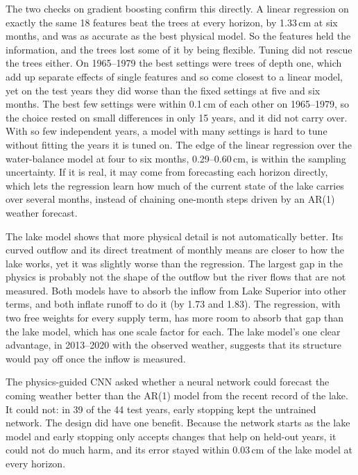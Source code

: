 \documentclass{article}
\begin{document}
The two checks on gradient boosting confirm this directly. A linear regression on exactly the same
18 features beat the trees at every horizon, by 1.33\,cm at six months, and was as accurate as the
best physical model. So the features held the information, and the trees lost some of it by being
flexible. Tuning did not rescue the trees either. On 1965--1979 the best settings were trees of
depth one, which add up separate effects of single features and so come closest to a linear
model, yet on the test years they did worse than the fixed settings at five and six months. The
best few settings were within 0.1\,cm of each other on 1965--1979, so the choice rested on small
differences in only 15 years, and it did not carry over. With so few independent years, a model
with many settings is hard to tune without fitting the years it is tuned on. The edge of the linear
regression over the water-balance model at four to six months, 0.29--0.60\,cm, is within the
sampling uncertainty. If it is real, it may come from forecasting each horizon directly, which
lets the regression learn how much of the current state of the lake carries over several months,
instead of chaining one-month steps driven by an AR(1) weather forecast.

The lake model shows that more physical detail is not automatically better. Its curved outflow
and its direct treatment of monthly means are closer to how the lake works, yet it was slightly
worse than the regression. The largest gap in the physics is probably not the shape of the
outflow but the river flows that are not measured. Both models have to absorb the inflow from
Lake Superior into other terms, and both inflate runoff to do it (by 1.73 and 1.83). The
regression, with two free weights for every supply term, has more room to absorb that gap than
the lake model, which has one scale factor for each. The lake model's one clear advantage, in
2013--2020 with the observed weather, suggests that its structure would pay off once the inflow
is measured.

The physics-guided CNN asked whether a neural network could forecast the coming weather better
than the AR(1) model from the recent record of the lake. It could not: in 39 of the 44 test years,
early stopping kept the untrained network. The design did have one benefit. Because the network
starts as the lake model and early stopping only accepts changes that help on held-out years, it
could not do much harm, and its error stayed within 0.03\,cm of the lake model at every horizon.
\end{document}
